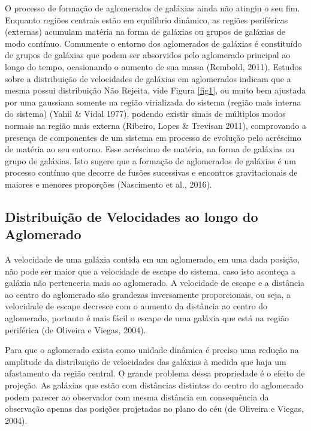 \documentclass[12pt,fleqn]{article}
\begin{document}
{O processo de formação de aglomerados de galáxias ainda não atingiu o seu fim.
Enquanto regiões centrais estão em equilíbrio dinâmico, as regiões periféricas (externas)
acumulam matéria na forma de galáxias ou grupos de galáxias de modo contínuo. Comumente
o entorno dos aglomerados de galáxias é constituído de grupos de galáxias que podem ser
absorvidos pelo aglomerado principal ao longo do tempo, ocasionando o aumento de sua
massa (Rembold, 2011). Estudos sobre a distribuição de velocidades de galáxias em aglomerados indicam que a mesma possui distribuição Não Rejeita, vide Figura \ref{fig1}, ou muito bem ajustada por uma
gaussiana somente na região virializada do sistema (região mais interna do sistema) (Yahil \&
Vidal 1977), podendo existir sinais de múltiplos modos normais na região mais externa
(Ribeiro, Lopes \& Trevisan 2011), comprovando a presença de componentes de um sistema
em processo de evolução pelo acréscimo de matéria ao seu entorno. Esse
acréscimo de matéria, na forma de galáxias ou grupo de galáxias. 
Isto sugere que a formação de aglomerados de galáxias é
um processo contínuo que decorre de fusões sucessivas e encontros gravitacionais de maiores e menores proporções (Nascimento et al., 2016).



\subsection{Distribuição de Velocidades ao longo do Aglomerado}
A velocidade de uma galáxia contida em um aglomerado, em uma dada posição, não
pode ser maior que a velocidade de escape do sistema, caso isto aconteça a galáxia não
pertenceria mais ao aglomerado. A velocidade de escape e a distância ao centro do
aglomerado são grandezas inversamente proporcionais, ou seja, a velocidade de escape
decresce com o aumento da distância ao centro do aglomerado, portanto é mais fácil o escape
de uma galáxia que está na região periférica (de Oliveira e Viegas, 2004).

Para que o aglomerado exista como unidade dinâmica é preciso uma redução na amplitude da
distribuição de velocidades das galáxias à medida que haja um afastamento da região central.
O grande problema dessa propriedade é o efeito de projeção. As galáxias que estão com
distâncias distintas do centro do aglomerado podem parecer ao observador com mesma
distância em consequência da observação apenas das posições projetadas no plano do céu (de
Oliveira e Viegas, 2004).

}
\end{document}
